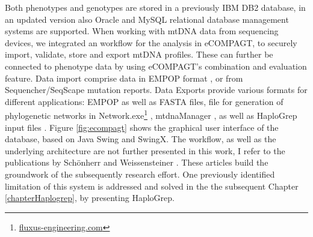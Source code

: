 Both phenotypes and genotypes are stored in a previously IBM DB2 database, in an updated version also Oracle and MySQL relational database management systems are supported. When working with mtDNA data from sequencing devices, we integrated an workflow for the analysis in eCOMPAGT, to securely import, validate, store and export mtDNA profiles.  These can further be connected to phenotype data by using eCOMPAGT's combination and evaluation feature. Data import comprise data in EMPOP format \cite{Parson2007}, or from Sequencher/SeqScape mutation reports. Data Exports provide various formats for different applications: EMPOP as well as FASTA files, file for generation of phylogenetic networks in Network.exe\footnote{\url{fluxus-engineering.com}}  \cite{Bandelt1999}, mtdnaManager \cite{Lee2008}, as well as HaploGrep input files \cite{Kloss-Brandstatter2011,Weissensteiner2016a}. Figure \ref{fig:ecompagt} shows the graphical user interface of the database, based on Java Swing and SwingX. The workflow, as well as the underlying architecture are not further presented in this work, I refer to the publications by Sch\"onherr and Weissensteiner \cite{Schoenherr2009,Weissensteiner2010}. These articles build the groundwork of the subsequently research effort. One previously identified limitation of this system is addressed and solved in the the subsequent Chapter \ref{chapterHaplogrep}, by presenting HaploGrep.




